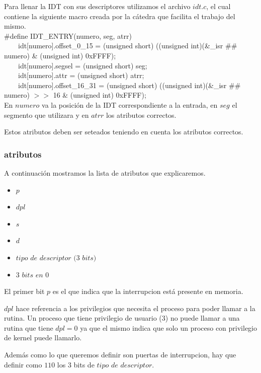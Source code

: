 \documentclass[a4paper,10pt,twoside]{article}
\begin{document}
Para llenar la IDT con sus descriptores utilizamos el archivo $idt.c$, el cual contiene la siguiente macro creada por la cátedra que facilita el trabajo del mismo.\\

\#define IDT\_ENTRY(numero, seg, atrr) \\                                                                      
\ \ \ \ idt[numero].offset\_0\_15 = (unsigned short) ((unsigned int)(\&\_isr \#\# numero) \& (unsigned int) 0xFFFF); \\
\ \ \ \ idt[numero].segsel = (unsigned short) seg; \\
\ \ \ \ idt[numero].attr = (unsigned short) atrr; \\
\ \ \ \ idt[numero].offset\_16\_31 = (unsigned short) ((unsigned int)(\&\_isr \#\# numero) $>>$ 16 \& (unsigned int) 0xFFFF); \\

En $numero$ va la posición de la IDT correspondiente a la entrada, en $seg$ el segmento que utilizara y en $atrr$ los atributos correctos.

Estos atributos deben ser seteados teniendo en cuenta los atributos correctos.

\subsubsection{atributos}

A continuación mostramos la lista de atributos que explicaremos.
\begin{itemize}
 \item $p$
 \item $dpl$
 \item $s$
 \item $d$
 \item $tipo$ $de$ $descriptor$ $(3$ $bits)$
 \item $3$ $bits$ $en$ $0$
\end{itemize}

El primer bit $p$ es el que indica que la interrupcion está presente en memoria.

$dpl$ hace referencia a los privilegios que necesita el proceso para poder llamar a la rutina. Un proceso que tiene privilegio de usuario ($3$) no puede llamar a una rutina que tiene $dpl = 0$ ya que el mismo indica que solo un proceso con privilegio de kernel puede llamarlo.

Además como lo que queremos definir son puertas de interrupcion, hay que definir como $1 1 0$ los 3 bits de $tipo$ $de$ $descriptor$.
\end{document}

